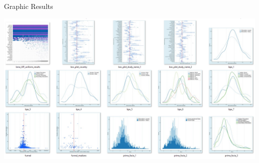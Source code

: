 \documentclass{beamer} %
\begin{document}



\begin{frame}{Graphic Results}
    \begin{center}
        \includegraphics[width=1\textwidth]{Figures/graphical_results.png}
    \end{center}
\end{frame}
\end{document}
